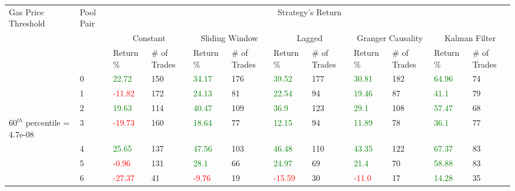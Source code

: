\begin{table}[htb!]
    \centering
    \begin{adjustwidth}{-0.9in}{-0.9in}
        \begin{tabular}{|p{5em}|p{2em}|p{3em}|p{3em}|p{3em}|p{3em}|p{3em}|p{3em}|p{3em}|p{3em}|p{3em}|p{3em}|}\hline
            Gas Price Threshold & Pool Pair & \multicolumn{10}{|c|}{Strategy's Return} \\\cline{3-12}
            &   & \multicolumn{2}{|c|}{Constant} & \multicolumn{2}{|c|}{Sliding Window} & \multicolumn{2}{|c|}{Lagged} & \multicolumn{2}{|c|}{Granger Causality} & \multicolumn{2}{|c|}{Kalman Filter}\\\cline{3-12}
            & & Return \% & \# of Trades & Return \% & \# of Trades & Return \% & \# of Trades & Return \% & \# of Trades & Return \% & \# of Trades\\\hline
            
            & 0 & \textcolor{green}{22.72} & 150 & \textcolor{green}{34.17} & 176 & \textcolor{green}{39.52} & 177 & \textcolor{green}{30.81} & 182 & \textcolor{green}{64.96} & 74\\\cline{3-12}
            & 1 & \textcolor{red}{-11.82} & 172 & \textcolor{green}{24.13} & 81 & \textcolor{green}{22.54} & 94 & \textcolor{green}{19.46} & 87 & \textcolor{green}{41.1} & 79\\\cline{3-12}
            & 2 & \textcolor{green}{19.63} & 114 & \textcolor{green}{40.47} & 109 & \textcolor{green}{36.9} & 123 & \textcolor{green}{29.1} & 108 & \textcolor{green}{57.47} & 68\\\cline{3-12}
            $60^{th}$ percentile = 4.7e-08 & 3 & \textcolor{red}{-19.73} & 160 & \textcolor{green}{18.64} & 77 & \textcolor{green}{12.15} & 94 & \textcolor{green}{11.89} & 78 & \textcolor{green}{36.1} & 77\\[-5.5ex]\cline{3-12}
            & 4 & \textcolor{green}{25.65} & 137 & \textcolor{green}{47.56} & 103 & \textcolor{green}{46.48} & 110 & \textcolor{green}{43.35} & 122 & \textcolor{green}{67.37} & 83\\\cline{3-12}
            & 5 & \textcolor{red}{-0.96} & 131 & \textcolor{green}{28.1} & 66 & \textcolor{green}{24.97} & 69 & \textcolor{green}{21.4} & 70 & \textcolor{green}{58.88} & 83\\\cline{3-12}
            & 6 & \textcolor{red}{-27.37} & 41 & \textcolor{red}{-9.76} & 19 & \textcolor{red}{-15.59} & 30 & \textcolor{red}{-11.0} & 17 & \textcolor{green}{14.28} & 35\\\hline\hline


\end{tabular}
\end{adjustwidth}
\end{table}
